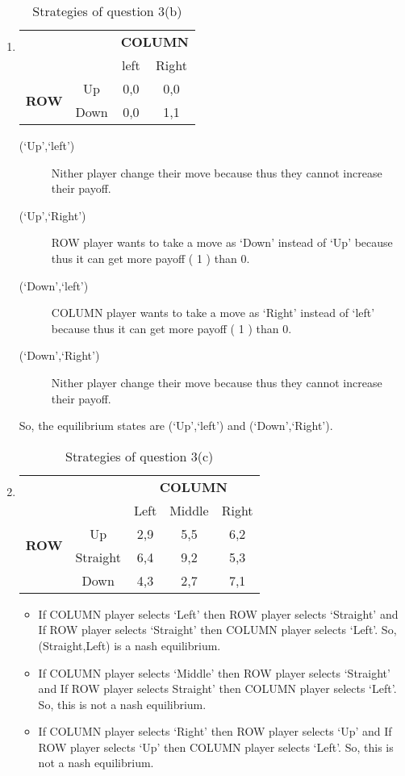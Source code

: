 \documentclass[a4paper,12pt]{article}
\begin{document}
\begin{enumerate}
\begin{enumerate}
 \item 
\begin{table}[H]
\centering
\begin{tabular}{@{}cccc@{}}
\toprule
\multicolumn{2}{c}{} & \multicolumn{2}{c}{\bfseries COLUMN}\\
\multicolumn{2}{c}{} & left & Right\\
\multirow{2}{*}{\bfseries ROW} & Up & 0,0 & 0,0\\
 & Down & 0,0 & 1,1\\
\bottomrule
\end{tabular}
\caption{Strategies of question 3(b)}
\end{table}

\begin{description}
 \item [(`Up',`left')] Nither player change their move because thus they cannot increase their payoff.
 \item [(`Up',`Right')] ROW player wants to take a move as `Down' instead of `Up' because thus it can get more payoff ( 1 ) than 0.
 \item [(`Down',`left')] COLUMN player wants to take a move as `Right' instead of `left' because thus it can get more payoff ( 1 ) than 0.
 \item [(`Down',`Right')] Nither player change their move because thus they cannot increase their payoff.
 \end{description}
 
 So, the equilibrium states are (`Up',`left') and (`Down',`Right').
\item
\begin{table}[H]
\centering
\begin{tabular}{@{}ccccc@{}}
\toprule
\multicolumn{2}{c}{} & \multicolumn{3}{c}{\bfseries COLUMN}\\
\multicolumn{2}{c}{} & Left & Middle & Right\\
\multirow{2}{*}{\bfseries ROW} & Up & 2,9 & 5,5 & 6,2\\
 & Straight & 6,4 & 9,2 & 5,3\\
 & Down & 4,3 & 2,7 & 7,1\\
 \bottomrule
\end{tabular}
\caption{Strategies of question 3(c)}
\end{table}
\begin{itemize}
\item
If COLUMN player selects `Left' then ROW player selects `Straight' and If ROW player selects `Straight' then COLUMN player selects `Left'. So, (Straight,Left) is a nash equilibrium.
\item
If COLUMN player selects `Middle' then ROW player selects `Straight' and If ROW player selects Straight' then COLUMN player selects `Left'. So, this is not a nash equilibrium.
\item
If COLUMN player selects `Right' then ROW player selects `Up' and If ROW player selects `Up' then COLUMN player selects `Left'. So, this is not a nash equilibrium.
\end{itemize}


\end{enumerate}
\end{enumerate}
\end{document}
